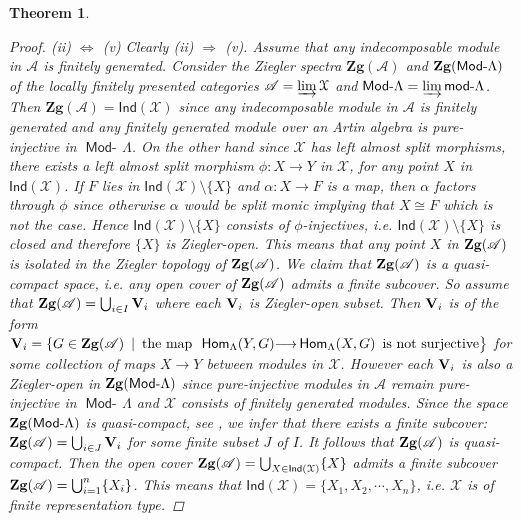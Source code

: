 \documentclass[oneside, a4paper,reqno]{amsart}
\numberwithin{equation}{section}
\newtheorem{thm}{Theorem}[section]
\theoremstyle{definition}
\begin{document}
\begin{thm}
\begin{proof}
(ii)  $\Leftrightarrow$ (v) Clearly (ii) $\Rightarrow$ (v). Assume
that any indecomposable module in ${\mathscr A}$ is finitely generated.
Consider the Ziegler spectra $\mathbf{Zg}({\mathscr A})$ and ${\bf
Zg}(\operatorname*{\mathsf{Mod}-\!}\Lambda)$ of the locally finitely presented categories ${\mathscr A} =
\operatorname*{\varinjlim}{\mathcal X}$ and $\operatorname*{\mathsf{Mod}-\!}\Lambda = \operatorname*{\varinjlim}\operatorname*{\mathsf{mod}-\!}\Lambda$. Then
$\mathbf{Zg}({\mathscr A}) = \mathsf{Ind}({\mathcal X})$ since any indecomposable module
in ${\mathscr A}$ is finitely generated and any finitely generated module over
an Artin algebra is pure-injective in $\operatorname*{\mathsf{Mod}-\!}\Lambda$. On the other
hand since ${\mathcal X}$ has left almost split morphisms, there exists a left
almost split morphism $\phi \colon X {\longrightarrow} Y$ in ${\mathcal X}$, for any point
$X$ in $\mathsf{Ind}({\mathcal X})$. If $F$ lies in $\mathsf{Ind}({\mathcal X})\setminus
\{X\}$ and $\alpha \colon X{\longrightarrow} F$ is a map, then $\alpha$ factors
through $\phi$ since otherwise $\alpha$ would be split monic
implying that $X \cong F$ which is not the case. Hence
$\mathsf{Ind}({\mathcal X})\setminus \{X\}$ consists of $\phi$-injectives,
i.e. $\mathsf{Ind}({\mathcal X})\setminus \{X\}$ is closed and therefore
$\{X\}$ is Ziegler-open. This means that any point $X$ in ${\bf
Zg}({\mathscr A})$ is isolated in the Ziegler topology of ${\bf Zg}({\mathscr A})$.
We
claim that ${\bf Zg}({\mathscr A})$  is a quasi-compact space, i.e. any open
cover of ${\bf Zg}({\mathscr A})$ admits a finite subcover.
So assume that $
{\bf Zg}({\mathscr A}) = \bigcup_{i\in I}{\bf V}_{i}$ where each ${\bf V}_{i}$
is Ziegler-open subset. Then ${\bf V}_{i}$ is of the form ${\bf
V}_{i} = \{G \in {\bf Zg}({\mathscr A}) \,\ | \,\ \text{the map}\,\
\operatorname{\mathsf{Hom}}_{\Lambda}(Y,G) {\longrightarrow} \operatorname{\mathsf{Hom}}_{\Lambda}(X,G) \,\,\, \text{is not
surjective} \big\}$ for some collection of maps $X {\longrightarrow} Y$ between
modules in ${\mathcal X}$. However each ${\bf V}_{i}$ is also a Ziegler-open
in ${\bf Zg}(\operatorname*{\mathsf{Mod}-\!}\Lambda)$ since pure-injective modules in ${\mathscr A}$
remain pure-injective in $\operatorname*{\mathsf{Mod}-\!}\Lambda$ and ${\mathcal X}$ consists of finitely
generated modules. Since the space ${\bf Zg}(\operatorname*{\mathsf{Mod}-\!}\Lambda)$ is
quasi-compact, see \cite{Krause:memoirs}, we infer that there exists
a finite subcover: $ {\bf Zg}({\mathscr A}) = \bigcup_{i\in J}{\bf V}_{i}$ for
some finite subset $J$ of $I$. It follows that ${\bf Zg}({\mathscr A})$ is
quasi-compact. Then the open cover ${\bf Zg}({\mathscr A}) = \bigcup_{X\in
\mathsf{Ind}({\mathcal X})}\{X\}$ admits a finite subcover ${\bf Zg}({\mathscr A}) =
\bigcup^{n}_{i = 1}\{X_{i}\}$. This means that $\mathsf{Ind}({\mathcal X}) =
\{X_{1},X_{2},\cdots,X_{n}\}$, i.e. ${\mathcal X}$ is of finite representation
type.


\end{proof}
\end{thm}
\end{document}
